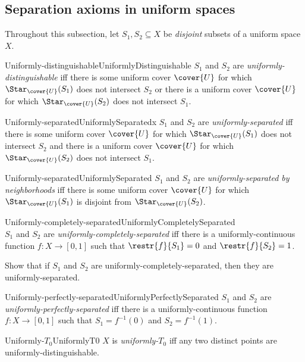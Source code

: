 \subsection{Separation axioms in uniform spaces}

Throughout this subsection, let $S_1,S_2\subseteq X$ be \emph{disjoint} subsets of a uniform space $X$.
\begin{dfn}{Uniformly-distinguishable}{UniformlyDistinguishable}
$S_1$ and $S_2$ are \emph{uniformly-distinguishable} iff there is some uniform cover $\cover{U}$ for which $\Star _{\cover{U}}(S_1)$ does not intersect $S_2$ or there is a uniform cover $\cover{U}$ for which $\Star _{\cover{U}}(S_2)$ does not intersect $S_1$.
\end{dfn}
\begin{dfn}{Uniformly-separated}{UniformlySeparatedx}
$S_1$ and $S_2$ are \emph{uniformly-separated} iff there is some uniform cover $\cover{U}$ for which $\Star _{\cover{U}}(S_1)$ does not intersect $S_2$ and there is a uniform cover $\cover{U}$ for which $\Star _{\cover{U}}(S_2)$ does not intersect $S_1$.
\end{dfn}
\begin{dfn}{Uniformly-separated}{UniformlySeparated}
$S_1$ and $S_2$ are \emph{uniformly-separated by neighborhoods} iff there is some uniform cover $\cover{U}$ for which $\Star _{\cover{U}}(S_1)$ is disjoint from $\Star _{\cover{U}}(S_2)$.
\end{dfn}
\begin{dfn}{Uniformly-completely-separated}{UniformlyCompletelySeparated}
\\ $S_1$ and $S_2$ are \emph{uniformly-completely-separated} iff there is a uniformly-continuous function $f\colon X\rightarrow [0,1]$ such that $\restr{f}{S_1}=0$ and $\restr{f}{S_2}=1$.
\end{dfn}
\begin{exr}{}{}
Show that if $S_1$ and $S_2$ are uniformly-completely-separated, then they are uniformly-separated.
\end{exr}
\begin{dfn}{Uniformly-perfectly-separated}{UniformlyPerfectlySeparated}
$S_1$ and $S_2$ are \emph{uniformly-perfectly-separated} iff there is a uniformly-continuous function $f\colon X\rightarrow [0,1]$ such that $S_1=f^{-1}(0)$ and $S_2=f^{-1}(1)$.
\end{dfn}
\begin{dfn}{Uniformly-$T_0$}{UniformlyT0}
$X$ is \emph{uniformly-$T_0$} iff any two distinct points are uniformly-distinguishable.
\end{dfn}
